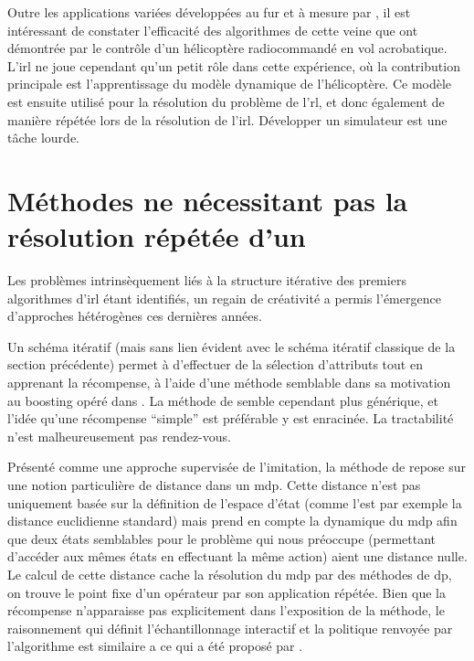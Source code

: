 \documentclass[frenchb,a4paper,justified,notoc]{tufte-book}
\begin{document}
   Outre les applications variées développées au fur et à mesure par \citet{ratliff2009learning}, il est intéressant de constater l'efficacité des algorithmes de cette veine que \citet{abbeel2010autonomous} ont démontrée par le contrôle d'un hélicoptère radiocommandé en vol acrobatique. L'\gls{irl} ne joue cependant qu'un petit rôle dans cette expérience, où la contribution principale est l'apprentissage du modèle dynamique de l'hélicoptère. Ce modèle est ensuite utilisé pour la résolution du problème de l'\gls{rl}, et donc également de manière répétée lors de la résolution de l'\gls{irl}. Développer un simulateur est une tâche lourde.
\section{Méthodes ne nécessitant pas la résolution répétée d'un }
\label{sec-3-4}
\label{hier-nouveauxalgos}

   Les problèmes intrinsèquement liés à la structure itérative des premiers algorithmes d'\gls{irl} étant identifiés, un regain de créativité a permis l'émergence d'approches hétérogènes ces dernières années.

   Un schéma itératif (mais sans lien évident avec le schéma itératif classique de la section précédente) permet à \citet{levine2010feature} d'effectuer de la sélection d'attributs tout en apprenant la récompense, à l'aide d'une méthode semblable dans sa motivation au \gls{boosting} opéré dans \citep{ratliff2007boosting}. La méthode de \citet{levine2010feature} semble cependant plus générique, et l'idée qu'une récompense ``simple'' est préférable y est enracinée. La tractabilité n'est malheureusement pas rendez-vous.
   
   Présenté comme une approche supervisée de l'imitation, la méthode de \citet{melo2010learning} repose sur une notion particulière de distance dans un \gls{mdp}. Cette distance n'est pas uniquement basée sur la définition de l'espace d'état (comme l'est par exemple la distance euclidienne standard) mais prend en compte la dynamique du \gls{mdp} afin que deux états semblables pour le problème qui nous préoccupe (permettant d'accéder aux mêmes états en effectuant la même action) aient une distance nulle. Le calcul de cette distance cache la résolution du \gls{mdp} par des méthodes de \gls{dp}, on trouve le point fixe d'un opérateur par son application répétée. Bien que la récompense n'apparaisse pas explicitement dans l'exposition de la méthode, le raisonnement qui définit l'échantillonnage interactif et la politique renvoyée par l'algorithme est similaire a ce qui a été proposé par \citet{lopes2009active}.
\end{document}
